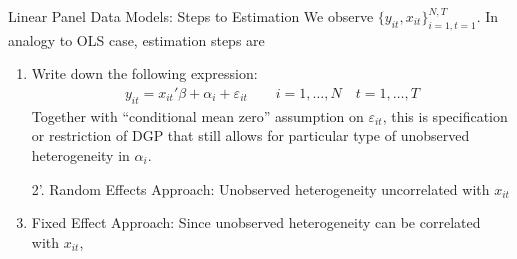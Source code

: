 \documentclass[aspectratio=169, handout]{beamer}
\begin{document}
{\scriptsize
\begin{frame}{Linear Panel Data Models: Steps to Estimation}
We observe $\{y_{it},x_{it}\}_{i=1,t=1}^{N,T}$.
In analogy to OLS case, estimation steps are
\begin{enumerate}
  \item Write down the following expression:
    \begin{align}
      y_{it}
      =
      x_{it}'\beta
      + \alpha_i
      + \varepsilon_{it}
      \qquad
      i = 1,\ldots,N
      \quad t = 1,\ldots,T \label{panelmodel}
    \end{align}
    Together with ``conditional mean zero'' assumption on
    $\varepsilon_{it}$,
    this is
    \alert{specification} or \alert{restriction} of DGP that
    still allows for particular type of
    \alert{unobserved heterogeneity} in $\alpha_i$.

  \pause
  \item[2'.]
    \alert{Random Effects Approach}:
    Unobserved heterogeneity uncorrelated with $x_{it}$
    \pause


  \pause
  \item \alert{Fixed Effect Approach}:
    Since unobserved heterogeneity can be correlated with $x_{it}$,

\end{enumerate}
\end{frame}
}
\end{document}
